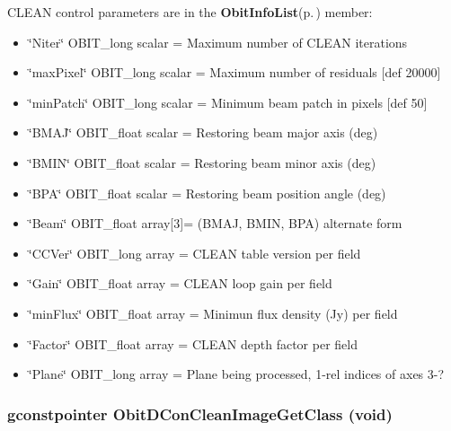 CLEAN control parameters are in the {\bf Obit\-Info\-List}{\rm (p.\,\pageref{structObitInfoList})} member: \begin{itemize}
\item \char`\"{}Niter\char`\"{} OBIT\_\-long scalar = Maximum number of CLEAN iterations \item \char`\"{}max\-Pixel\char`\"{} OBIT\_\-long scalar = Maximum number of residuals [def 20000] \item \char`\"{}min\-Patch\char`\"{} OBIT\_\-long scalar = Minimum beam patch in pixels [def 50] \item \char`\"{}BMAJ\char`\"{} OBIT\_\-float scalar = Restoring beam major axis (deg) \item \char`\"{}BMIN\char`\"{} OBIT\_\-float scalar = Restoring beam minor axis (deg) \item \char`\"{}BPA\char`\"{} OBIT\_\-float scalar = Restoring beam position angle (deg) \item \char`\"{}Beam\char`\"{} OBIT\_\-float array[3]= (BMAJ, BMIN, BPA) alternate form \item \char`\"{}CCVer\char`\"{} OBIT\_\-long array = CLEAN table version per field \item \char`\"{}Gain\char`\"{} OBIT\_\-float array = CLEAN loop gain per field \item \char`\"{}min\-Flux\char`\"{} OBIT\_\-float array = Minimun flux density (Jy) per field \item \char`\"{}Factor\char`\"{} OBIT\_\-float array = CLEAN depth factor per field \item \char`\"{}Plane\char`\"{} OBIT\_\-long array = Plane being processed, 1-rel indices of axes 3-? 
\end{itemize}
\subsubsection{\setlength{\rightskip}{0pt plus 5cm}gconstpointer Obit\-DCon\-Clean\-Image\-Get\-Class (void)}\label{ObitDConCleanImage_8c_a8}


